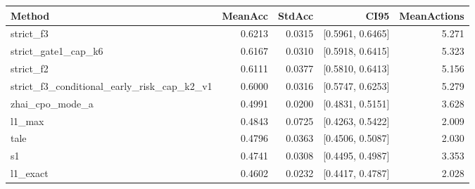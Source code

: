 \begin{tabular}{lrrrr}
\hline
Method & MeanAcc & StdAcc & CI95 & MeanActions \\
\hline
strict_f3 & 0.6213 & 0.0315 & [0.5961, 0.6465] & 5.271 \\
strict_gate1_cap_k6 & 0.6167 & 0.0310 & [0.5918, 0.6415] & 5.323 \\
strict_f2 & 0.6111 & 0.0377 & [0.5810, 0.6413] & 5.156 \\
strict_f3_conditional_early_risk_cap_k2_v1 & 0.6000 & 0.0316 & [0.5747, 0.6253] & 5.279 \\
zhai_cpo_mode_a & 0.4991 & 0.0200 & [0.4831, 0.5151] & 3.628 \\
l1_max & 0.4843 & 0.0725 & [0.4263, 0.5422] & 2.009 \\
tale & 0.4796 & 0.0363 & [0.4506, 0.5087] & 2.030 \\
s1 & 0.4741 & 0.0308 & [0.4495, 0.4987] & 3.353 \\
l1_exact & 0.4602 & 0.0232 & [0.4417, 0.4787] & 2.028 \\
\hline
\end{tabular}
